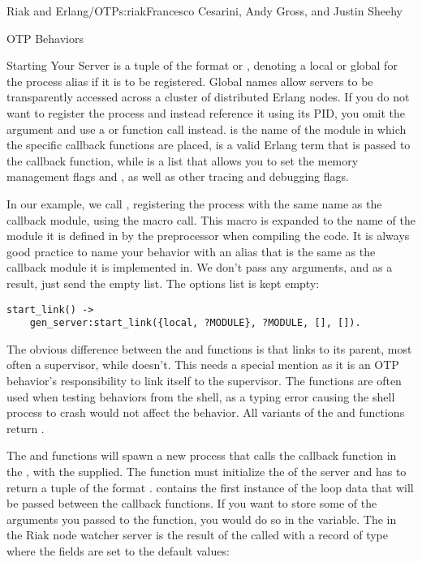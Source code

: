 \begin{aosachapter}{Riak and Erlang/OTP}{s:riak}{Francesco Cesarini, Andy Gross, and Justin Sheehy}
\begin{aosasect1}{OTP Behaviors}
\begin{aosasect2}{Starting Your Server}
\noindent {} is a tuple of the format  or
, denoting a local or global  for the
process alias if it is to be registered. Global names allow servers
to be transparently accessed across a cluster of distributed Erlang
nodes. If you do not want to register the process and instead
reference it using its PID, you omit the argument and use a
 or  function call
instead.  is the name of the module in which
the specific callback functions are placed,  is a
valid Erlang term that is passed to the  callback
function, while  is a list that allows you to set the
memory management flags  and ,
as well as other tracing and debugging flags.

In our example, we call , registering the process
with the same name as the callback module, using the 
macro call. This macro is expanded to the name of the module it is
defined in by the preprocessor when compiling the code. It is always
good practice to name your behavior with an alias that is the same as
the callback module it is implemented in. We don't pass any arguments,
and as a result, just send the empty list. The options list is kept
empty:

\begin{verbatim}
start_link() ->
    gen_server:start_link({local, ?MODULE}, ?MODULE, [], []).
\end{verbatim}

\noindent The obvious difference between the  and 
functions is that  links to its parent, most often a
supervisor, while  doesn't. This needs a special mention
as it is an OTP behavior's responsibility to link itself to the
supervisor. The  functions are often used when testing
behaviors from the shell, as a typing error causing the shell process
to crash would not affect the behavior. All variants of the
 and  functions return .

The  and  functions will spawn a new
process that calls the  callback function in the
, with the  supplied. The
 function must initialize the  of the server
and has to return a tuple of the format .  contains the first instance of the loop
data that will be passed between the callback functions. If you want
to store some of the arguments you passed to the  function, you
would do so in the  variable. The  in
the Riak node watcher server is the result of the
 called with a record of type 
where the fields are set to the default values:


\end{aosasect2}
\end{aosasect1}
\end{aosachapter}
